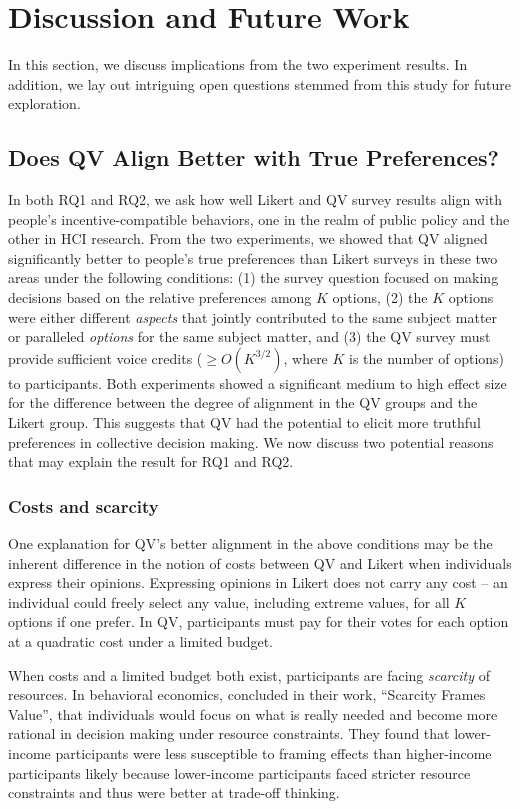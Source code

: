 \section{Discussion and Future Work} \label{discussion}
In this section, we discuss implications from the two experiment results. In addition, we lay out intriguing open questions stemmed from this study for future exploration.

\subsection{Does QV Align Better with True Preferences?}
In both RQ1 and RQ2, we ask how well Likert and QV survey results align with people's incentive-compatible behaviors, one in the realm of public policy and the other in HCI research. From the two experiments, we showed that QV aligned significantly better to people's true preferences than Likert surveys in these two areas under the following conditions: (1) the survey question  focused on making decisions based on the relative preferences among $K$ options, (2) the $K$ options were either different \textit{aspects} that jointly contributed to the same subject matter or paralleled \textit{options} for the same subject matter, and (3) the QV survey must provide sufficient voice credits ($\geq O(K^{3/2})$, where $K$ is the number of options) to participants. Both experiments showed a significant medium to high effect size for the difference between the degree of alignment in the QV groups and the Likert group. This suggests that QV had the potential to elicit more truthful preferences in collective decision making. We now discuss two potential reasons that may explain the result for RQ1 and RQ2.

\subsubsection{Costs and scarcity}
One explanation for QV's better alignment in the above conditions may be the inherent difference in the notion of costs between QV and Likert when individuals express their opinions. Expressing opinions in Likert does not carry any cost -- an individual could freely select any value, including extreme values, for all $K$ options if one prefer. In QV, participants must pay for their votes for each option at a quadratic cost under a limited budget. 

When costs and a limited budget both exist, participants are facing \textit{scarcity} of resources. In behavioral economics, \textcite{Shah2015a} concluded in their work, ``Scarcity Frames Value'', that individuals would focus on what is really needed and become more rational in decision making under resource constraints. They found that lower-income participants were less susceptible to framing effects than higher-income participants likely because lower-income participants faced stricter resource constraints and thus were better at trade-off thinking. 

